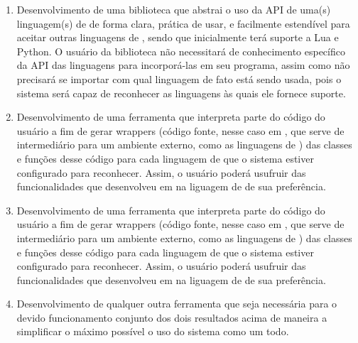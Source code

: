 \begin{enumerate}
  \item Desenvolvimento de uma biblioteca \cxx que abstrai o uso da API de uma(s)
        linguagem(s) de \script de forma clara, prática de usar, e facilmente
        estendível para aceitar outras linguagens de \script, sendo que
        inicialmente terá suporte a Lua e Python. O usuário da biblioteca não
        necessitará de conhecimento específico da API das linguagens para
        incorporá-las em seu programa, assim como não precisará se importar com
        qual linguagem de fato está sendo usada, pois o sistema será capaz de
        reconhecer as linguagens às quais ele fornece suporte.
  \item Desenvolvimento de uma ferramenta que interpreta parte do código \cxx do
        usuário a fim de gerar wrappers (código fonte, nesse caso em \cxx, que
        serve de intermediário para um ambiente externo, como as linguagens de
        \script) das classes e funções desse código para cada linguagem de \script
        que o sistema estiver configurado para reconhecer. Assim, o usuário
        poderá usufruir das funcionalidades que desenvolveu em \cxx na liguagem
        de \script de sua preferência.
  \item Desenvolvimento de uma ferramenta que interpreta parte do código \cxx do
        usuário a fim de gerar wrappers (código fonte, nesse caso em \cxx, que
        serve de intermediário para um ambiente externo, como as linguagens de
        \script) das classes e funções desse código para cada linguagem de \script
        que o sistema estiver configurado para reconhecer. Assim, o usuário
        poderá usufruir das funcionalidades que desenvolveu em \cxx na liguagem
        de \script de sua preferência.
  \item Desenvolvimento de qualquer outra ferramenta que seja necessária para o
        devido funcionamento conjunto dos dois resultados acima de maneira a
        simplificar o máximo possível o uso do sistema como um todo.
\end{enumerate}






